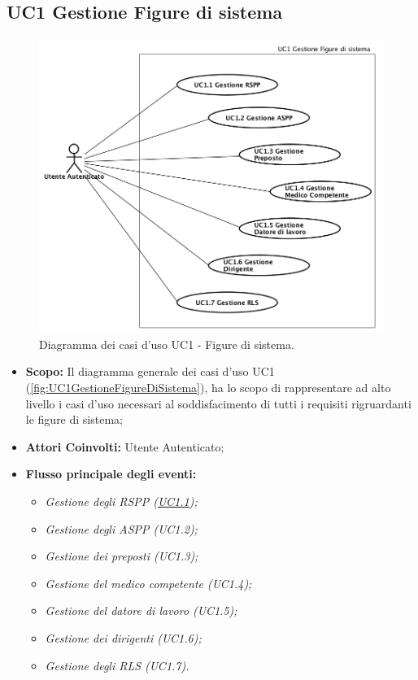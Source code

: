 	\subsection{UC1 Gestione Figure di sistema}
	\label{section:UC1}
	\begin{figure}[H]
		\begin{center}
			\includegraphics[width=14cm]{Pics/UC1GestioneFigureDiSistema.png}
			\caption{
				Diagramma dei casi d'uso UC1 - Figure di sistema.}
			\label{fig:UC1GestioneFigureDiSistema}
		\end{center}
	\end{figure}
	\begin{itemize}
		\item \textbf{Scopo:} Il diagramma generale dei casi d'uso UC1 (\autoref{fig:UC1GestioneFigureDiSistema}), ha lo scopo di rappresentare ad alto livello i casi d'uso necessari al soddisfacimento di tutti i requisiti rigruardanti le figure di sistema;
		\item \textbf{Attori Coinvolti:} Utente Autenticato;
		\item \textbf{Flusso principale degli eventi:} 
		\begin{itemize}
			\item \textit{Gestione degli RSPP (\hyperref[section:UC1_1]{UC1.1});}
			\item \textit{Gestione degli ASPP (UC1.2);}
			\item \textit{Gestione dei preposti (UC1.3);}
			\item \textit{Gestione del medico competente (UC1.4);}
			\item \textit{Gestione del datore di lavoro (UC1.5);}
			\item \textit{Gestione dei dirigenti (UC1.6);}
			\item \textit{Gestione degli RLS (UC1.7).}
		\end{itemize}
	\end{itemize}
		
